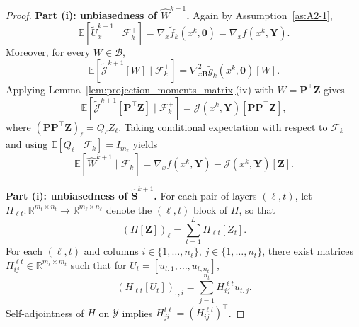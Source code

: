 \documentclass{pkumelon}
\theoremstyle{plain}
\newcommand{\R}{\mathbb{R}}
\newcommand{\E}{\mathbb{E}}
\begin{document}
\begin{proof}
\textbf{Part (i): unbiasedness of $\widehat W^{k+1}$. }
Again by Assumption~\ref{as:A2-1},
\begin{equation*}
\E[\tilde U_x^{k+1}\mid \mathcal F_k^+] = \nabla_x \tilde f_k(x^k,\mathbf 0) = \nabla_x f(x^k,\boldsymbol Y).
\end{equation*}
Moreover, for every $W\in\mathcal B$,
\begin{equation*}
\E[\tilde{\mathcal J}^{k+1}[W]\mid \mathcal F_k^+] = \nabla_{x\boldsymbol B}^2 \tilde g_k(x^k,\mathbf 0)[W].
\end{equation*}
Applying Lemma~\ref{lem:projection_moments_matrix}(iv) with $W=\boldsymbol P^\top\boldsymbol Z$ gives
\begin{equation*}
\E[\tilde{\mathcal J}^{k+1}[\boldsymbol P^\top\boldsymbol Z]\mid \mathcal F_k^+] = \mathcal J(x^k,\boldsymbol Y)[\boldsymbol P\boldsymbol P^\top\boldsymbol Z],
\end{equation*}
where $(\boldsymbol P\boldsymbol P^\top\boldsymbol Z)_\ell=Q_\ell Z_\ell$. Taking conditional expectation with respect to $\mathcal F_k$ and using $\E[Q_\ell\mid\mathcal F_k]=I_{m_\ell}$ yields
\begin{equation*}
\E[\widehat W^{k+1}\mid \mathcal F_k] = \nabla_x f(x^k,\boldsymbol Y)-\mathcal J(x^k,\boldsymbol Y)[\boldsymbol Z].
\end{equation*}

\textbf{Part (i): unbiasedness of $\widehat{\boldsymbol S}^{k+1}$. }
For each pair of layers $(\ell,t)$, let $H_{\ell t}:\R^{m_t\times n_t}\to\R^{m_\ell\times n_\ell}$ denote the $(\ell,t)$ block of $H$, so that
\begin{equation*}
(H[\boldsymbol Z])_\ell=\sum_{t=1}^L H_{\ell t}[Z_t].
\end{equation*}
For each $(\ell,t)$ and columns $i\in\{1,\ldots,n_\ell\}$, $j\in\{1,\ldots,n_t\}$, there exist matrices $H_{ij}^{\ell t}\in\R^{m_\ell\times m_t}$ such that for $U_t=[u_{t,1},\ldots,u_{t,n_t}]$,
\begin{equation*}
(H_{\ell t}[U_t])_{:,i} = \sum_{j=1}^{n_t} H_{ij}^{\ell t}u_{t,j}.
\end{equation*}
Self-adjointness of $H$ on $\mathcal Y$ implies $H_{ji}^{t\ell}=(H_{ij}^{\ell t})^\top$.


\end{proof}
\end{document}

